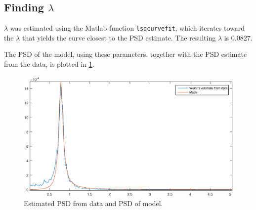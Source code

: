 \subsection{Finding $\lambda$}

$\lambda$ was estimated using the Matlab function \texttt{lsqcurvefit}, which iterates toward the $\lambda$ that yields the curve closest to the PSD estimate. The resulting $\lambda$ is $0.0827$.

The PSD of the model, using these parameters, together with the PSD estimate from the data, is plotted in \cref{fig:PSD}.

\begin{figure}
	\centering
	\includegraphics[width=\textwidth]{images/oppg2/PSD}
	\caption{Estimated PSD from data and PSD of model.}
	\label{fig:PSD}
\end{figure}
